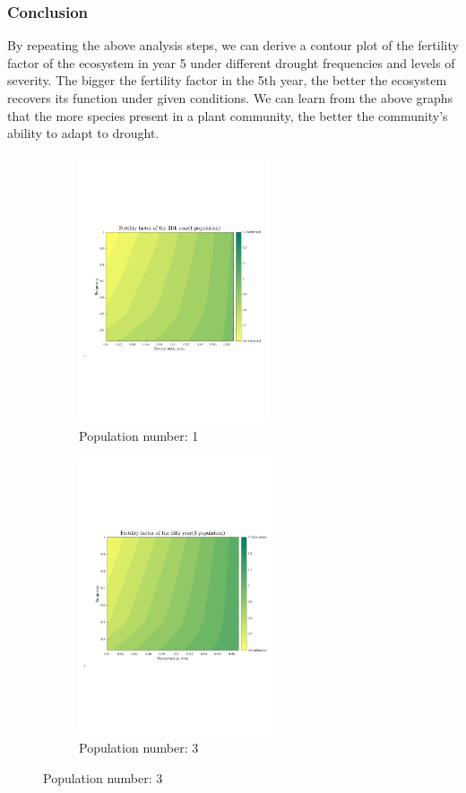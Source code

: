 \documentclass{mcmthesis}
\begin{document}
\subsubsection{Conclusion}

\indent

By repeating the above analysis steps, we can derive a contour plot of the fertility factor of the ecosystem in year 5 under different drought frequencies and levels of severity. The bigger the fertility factor in the 5th year, the better the ecosystem recovers its function under given conditions. We can learn from the above graphs that the more species present in a plant community, the better the community's ability to adapt to drought.


\begin{figure}
  \centering
  \hspace{1cm}
  \begin{subfigure}{0.4\textwidth}
    \includegraphics[width=5.6cm]{img/Contour_1.pdf}
    \caption{Population number: 1$\quad\quad\quad$}
    \label{fig:Population number 1}
  \end{subfigure}
  \hspace{0cm}
  \begin{subfigure}{0.4\textwidth}
    \includegraphics[width=5.8cm]{img/Contour_3.pdf}
    \caption{Population number: 3$\quad\quad\quad$}
    \label{fig:Population number 3}
  \end{subfigure}
  

\end{figure}
\end{document}
